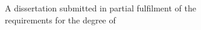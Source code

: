 \thispagestyle{empty}
\begin{center}
\vspace*{1.2cm}

{\Large\bfseries\universityName\par}
\vspace{0.4cm}
{\large\facultyName\par}
\vspace{0.2cm}
{\large\departmentName\par}

\vspace{2.6cm}

{\LARGE\bfseries\thesisTitle\par}

\vspace{1.6cm}

{\large\bfseries\authorName\par}
\vspace{0.3cm}
{\large\authorIndexNo\par}

\vfill

{\large
A dissertation submitted in partial fulfilment of the\\
requirements for the degree of\\[0.4cm]
\bfseries\degreeName\par}

\vspace{1.4cm}

{\large\submissionMonthYear\par}

\vspace{1.2cm}
\end{center}
\clearpage
